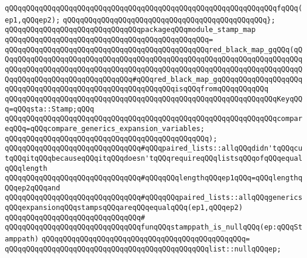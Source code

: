 \verb|qQQqqQQqqQQqqQQqqQQqqQQqqQQqqQQqqQQqqQQqqQQqqQQqqQQqqQQqqQQqqQQqfqQQq(ep1,qQQqep2);|\newline
\verb|qQQqqQQqqQQqqQQqqQQqqQQqqQQqqQQqqQQqqQQqqQQqqQQq};|\newline
\newline
\verb|qQQqqQQqqQQqqQQqqQQqqQQqqQQqqQQqpackageqQQqmodule_stamp_map|\newline
\verb|qQQqqQQqqQQqqQQqqQQqqQQqqQQqqQQqqQQqqQQqqQQqqQQq=|\newline
\verb|qQQqqQQqqQQqqQQqqQQqqQQqqQQqqQQqqQQqqQQqqQQqqQQqred_black_map_gqQQq(qQQqqQQqqQQqqQQqqQQqqQQqqQQqqQQqqQQqqQQqqQQqqQQqqQQqqQQqqQQqqQQqqQQqqQQqqQQqqQQqqQQqqQQqqQQqqQQqqQQqqQQqqQQqqQQqqQQqqQQqqQQqqQQqqQQqqQQqqQQqqQQqqQQqqQQqqQQqqQQqqQQqqQQqqQQq#qQQqred_black_map_gqQQqqQQqqQQqqQQqqQQqqQQqqQQqqQQqqQQqqQQqqQQqqQQqqQQqqQQqqQQqisqQQqfromqQQqqQQqqQQq|\newline
\newline
\verb|qQQqqQQqqQQqqQQqqQQqqQQqqQQqqQQqqQQqqQQqqQQqqQQqqQQqqQQqqQQqqQQqKeyqQQq=qQQqsta::Stamp;qQQq|\newline
\newline
\verb|qQQqqQQqqQQqqQQqqQQqqQQqqQQqqQQqqQQqqQQqqQQqqQQqqQQqqQQqqQQqqQQqcompareqQQq=qQQqcompare_generics_expansion_variables;|\newline
\newline
\verb|qQQqqQQqqQQqqQQqqQQqqQQqqQQqqQQqqQQqqQQqqQQqqQQq);|\newline
\newline
\verb|qQQqqQQqqQQqqQQqqQQqqQQqqQQqqQQq#qQQqpaired_lists::allqQQqdidn'tqQQqcutqQQqitqQQqbecauseqQQqitqQQqdoesn'tqQQqrequireqQQqlistsqQQqofqQQqequalqQQqlength|\newline
\verb|qQQqqQQqqQQqqQQqqQQqqQQqqQQqqQQq#qQQqqQQqlengthqQQqep1qQQq=qQQqlengthqQQqep2qQQqand|\newline
\verb|qQQqqQQqqQQqqQQqqQQqqQQqqQQqqQQq#qQQqqQQqpaired_lists::allqQQqgenericsqQQqexpansionqQQqstampsqQQqareqQQqequalqQQq(ep1,qQQqep2)|\newline
\verb|qQQqqQQqqQQqqQQqqQQqqQQqqQQqqQQq#|\newline
\verb|qQQqqQQqqQQqqQQqqQQqqQQqqQQqqQQqfunqQQqstamppath_is_nullqQQq(ep:qQQqStamppath)|\newline
\verb|qQQqqQQqqQQqqQQqqQQqqQQqqQQqqQQqqQQqqQQqqQQqqQQq=|\newline
\verb|qQQqqQQqqQQqqQQqqQQqqQQqqQQqqQQqqQQqqQQqqQQqqQQqlist::nullqQQqep;|\newline
\newline

